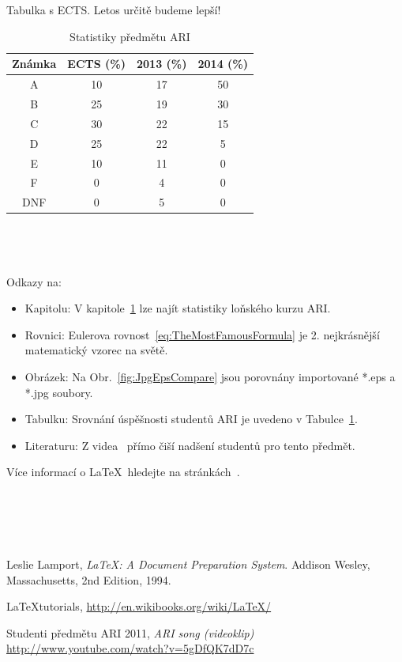 \documentclass[twoside]{article}
\begin{document}
\newpage{}

\subsection{~}
Tabulka s ECTS. Letos určitě budeme lepší!
\label{sec:Tab}
\begin{table}[htb]%
\centering
\begin{tabular}{c|c|c|c}
Známka & ECTS (\%) & 2013 (\%) & 2014 (\%)\\
\hline
A 	& 10 	& 17 	& 50\\
B 	& 25 	& 19 	& 30\\
C 	& 30 	& 22 	& 15\\
D 	& 25 	& 22 	& 5\\
E 	& 10 	& 11 	& 0	\\
F 	& 0 	& 4 	& 0	\\
DNF	& 0 	& 5 	& 0
\end{tabular}
\caption{Statistiky předmětu ARI}
\label{tab:AriStats}
\end{table}

\subsection{~}
\label{sec:Ref}
Odkazy na:
\begin{itemize}
	\item Kapitolu: V kapitole~\ref{tab:AriStats} lze najít statistiky loňského kurzu ARI.
	\item Rovnici: Eulerova rovnost~\ref{eq:TheMostFamousFormula} je 2. nejkrásnější matematický vzorec na světě.
	\item Obrázek: Na Obr.~\ref{fig:JpgEpsCompare} jsou porovnány importované *.eps a *.jpg soubory.
	\item Tabulku: Srovnání úspěšnosti studentů ARI je uvedeno v Tabulce~\ref{tab:AriStats}.
	\item Literaturu: Z videa~\cite{ARI11} přímo čiší nadšení studentů pro tento předmět.
\end{itemize}
Více informací o \LaTeX \ hledejte na stránkách~\cite{Wiki}.


\section{~}
\label{sec:ukol2}


\begin{thebibliography}{9}

  Leslie Lamport,
  \emph{\LaTeX: A Document Preparation System}.
  Addison Wesley, Massachusetts,
  2nd Edition,
  1994.

	\LaTeX tutorials, \url{http://en.wikibooks.org/wiki/LaTeX/}

	Studenti předmětu ARI 2011, \emph{ARI song (videoklip)} \url{http://www.youtube.com/watch?v=5gDfQK7dD7c}
\end{thebibliography}
\end{document}
